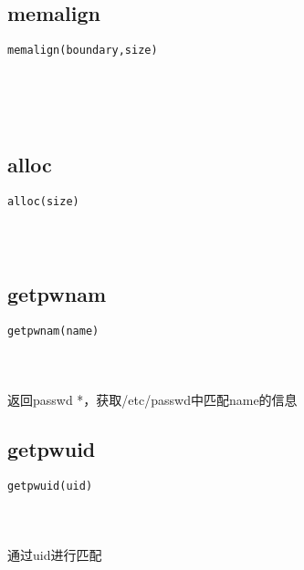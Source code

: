 \documentclass[10pt,a4paper]{article}
\begin{document}
\subsection{memalign}
\begin{spacing}{2.0}
\lstset{language=C,numbers=none}
\begin{lstlisting}
memalign(boundary,size)
\end{lstlisting}
{\large\color[rgb]{0.2,0.4,0.6}{boundary:}} \\
{\large\color[rgb]{0.2,0.4,0.6}{size:}}
\paragraph{ \ \ }
\end{spacing}

\subsection{alloc}
\begin{spacing}{2.0}
\lstset{language=C,numbers=none}
\begin{lstlisting}
alloc(size)
\end{lstlisting}
{\large\color[rgb]{0.2,0.4,0.6}{size:}}
\paragraph{ \ \ }
\end{spacing}

\section{\color[rgb]{0.2,0.4,0.6}{系统用户文件处理}}
\subsection{getpwnam}
\begin{spacing}{2.0}
\lstset{language=C,numbers=none}
\begin{lstlisting}
getpwnam(name)
\end{lstlisting}
{\large\color[rgb]{0.2,0.4,0.6}{name:}}
\paragraph{ \ \ }返回passwd *，获取/etc/passwd中匹配name的信息
\end{spacing}

\subsection{getpwuid}
\begin{spacing}{2.0}
\lstset{language=C,numbers=none}
\begin{lstlisting}
getpwuid(uid)
\end{lstlisting}
{\large\color[rgb]{0.2,0.4,0.6}{uid:}}
\paragraph{ \ \ }通过uid进行匹配
\end{spacing}
\end{document}
